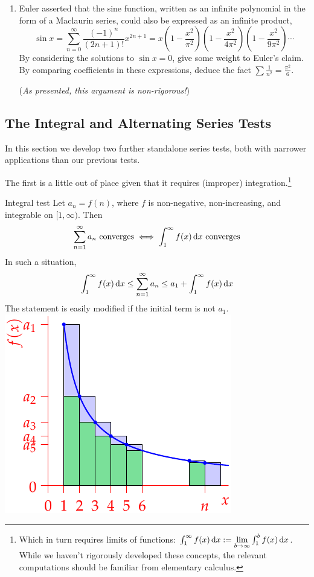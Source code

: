 \begin{exercises}{}{}
\begin{enumerate}
  
		\item\label{exs:eulersum} Euler asserted that the sine function, written as an infinite polynomial in the form of a Maclaurin series, could also be expressed as an infinite product,
	  \[
	  \sin x =\sum_{n=0}^\infty \frac{(-1)^n}{(2n+1)!}x^{2n+1} 
	  =x\left(1-\frac{x^2}{\pi^2}\right)\left(1-\frac{x^2}{4\pi^2}\right)
	  	\left(1-\frac{x^2}{9\pi^2}\right)\cdots 
	  \]
	  By considering the solutions to $\sin x=0$, give some weight to Euler's claim. By comparing coefficients in these expressions, deduce the fact $\sum \frac 1{n^2}=\frac{\pi^2}6$.\par
	  (\emph{As presented, this argument is non-rigorous!})
	\end{enumerate}
\end{exercises}


\clearpage


\subsection{The Integral and Alternating Series Tests}

In this section we develop two further standalone series tests, both with narrower applications than our previous tests.\smallbreak

The first is a little out of place given that it requires (improper) integration.\footnote{%
	Which in turn requires limits of functions: $\int_1^\infty f(x)\,{\mathrm{d} x}:=\lim\limits_{b\to\infty}\int_1^bf(x)\,{\mathrm{d} x}$. While we haven't rigorously developed these concepts, the relevant computations should be familiar from elementary calculus.%
} 

\begin{thm}[lower separated=false, sidebyside, sidebyside align=top seam, sidebyside gap=0pt, righthand width=0.4\linewidth]{Integral test}{}
	Let $a_n=f(n)$, where $f$ is non-negative, non-increasing, and integrable on $[1,\infty)$. Then
	\[
		\sum_{n=1}^\infty a_n\ \text{converges} \iff \int_1^\infty f(x)\,\dx\ \text{converges}
	\]
	In such a situation,
	\[
		\int_1^\infty f(x)\,{\mathrm{d} x}\le\sum_{n=1}^\infty a_n\le a_1+\int_1^\infty f(x)\,{\mathrm{d} x}
	\]
	The statement is easily modified if the initial term is not $a_1$.
	\tcblower
	\flushright\includegraphics[scale=0.95]{integraltest}
\end{thm}


